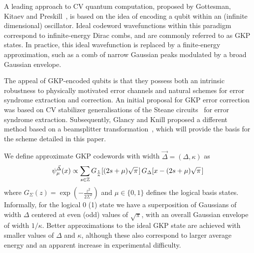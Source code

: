 \documentclass[prx,reprint,superscriptaddress,longbibliography,floatfix,nofootinbib]{revtex4-1}
\begin{document}
A leading approach to CV quantum computation, proposed by Gottesman, Kitaev and Preskill~\cite{PhysRevA.64.012310}, is based on the idea of encoding a qubit within an (infinite dimensional) oscillator.
Ideal codeword wavefunctions within this paradigm correspond to infinite-energy Dirac combs, and are commonly referred to as GKP states.
In practice, this ideal wavefunction is replaced by a finite-energy approximation, such as a comb of narrow Gaussian peaks modulated by a broad Gaussian envelope.

The appeal of GKP-encoded qubits is that they possess both an intrinsic robustness to physically motivated error channels and natural schemes for error syndrome extraction and correction.
An initial proposal for GKP error correction was based on CV stabilizer generalisations of the Steane circuits~\cite{PhysRevLett.78.2252} for error syndrome extraction.
Subsequently, Glancy and Knill proposed a different method based on a beamsplitter transformation~\cite{PhysRevA.73.012325}, which will provide the basis for the scheme detailed in this paper.

We define approximate GKP codewords with width $\vec{\Delta} = (\Delta,\kappa)$ as
%
\begin{equation}
   \psi_{\mu}^{\vec{\Delta}} (x) \propto \sum_{s \in \mathbb{Z}} G_{\frac{1}{\kappa}} [(2s+\mu)\sqrt{\pi} \hspace{0.04cm}] \hspace{0.05cm} G_{\Delta}[x-(2s+\mu)\sqrt{\pi} \hspace{0.04cm}] 
\end{equation}
%
where $G_{\Sigma}(z) = \exp{(-\frac{z^2}{2\Sigma^2})}$ and $\mu \in \{0,1\}$ defines the logical basis states.
Informally, for the logical 0 (1) state we have a superposition of Gaussians of width $\Delta$ centered at even (odd) values of $\sqrt{\pi}$, with an overall Gaussian envelope of width $1/\kappa$.
Better approximations to the ideal GKP state are achieved with smaller values of $\Delta$ and $\kappa$, although these also correspond to larger average energy and an apparent increase in experimental difficulty.
\end{document}
